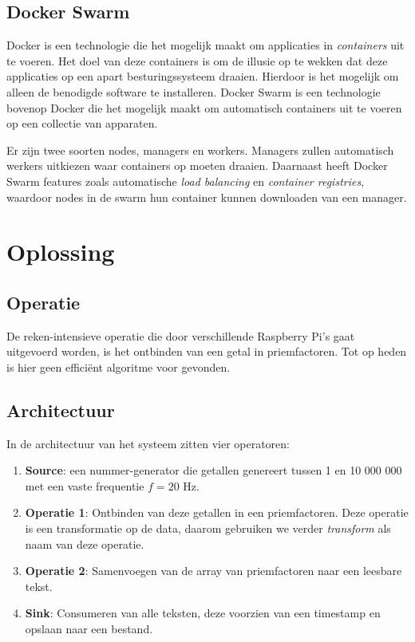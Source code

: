 \documentclass[twocolumn, a4paper]{article}
\begin{document}
\subsection{Docker Swarm}\label{ss:swarm}
Docker is een technologie die het mogelijk maakt om applicaties in \emph{containers} uit te voeren. Het doel van deze containers is om de illusie op te wekken dat deze applicaties op een apart besturingssysteem draaien. Hierdoor is het mogelijk om alleen de benodigde software te installeren. Docker Swarm is een technologie bovenop Docker die het mogelijk maakt om automatisch containers uit te voeren op een collectie van apparaten.

Er zijn twee soorten nodes, managers en workers. Managers zullen automatisch werkers uitkiezen waar containers op moeten draaien. Daarnaast heeft Docker Swarm features zoals automatische \emph{load balancing} en \emph{container registries}, waardoor nodes in de swarm hun container kunnen downloaden van een manager.

\section{Oplossing}

\subsection{Operatie}
De reken-intensieve operatie die door verschillende Raspberry Pi's gaat uitgevoerd worden, is het ontbinden van een getal in priemfactoren. Tot op heden is hier geen efficiënt algoritme voor gevonden.

\subsection{Architectuur}
In de architectuur van het systeem zitten vier operatoren:

\begin{enumerate}
    \item \textbf{Source}: een nummer-generator die getallen genereert tussen 1 en 10 000 000 met een vaste frequentie $f=20$ Hz.
    \item \textbf{Operatie 1}: Ontbinden van deze getallen in een priemfactoren. Deze operatie is een transformatie op de data, daarom gebruiken we verder \emph{transform} als naam van deze operatie.
    \item \textbf{Operatie 2}: Samenvoegen van de array van priemfactoren naar een leesbare tekst.
    \item \textbf{Sink}: Consumeren van alle teksten, deze voorzien van een timestamp en opslaan naar een bestand. 
\end{enumerate}
\end{document}
